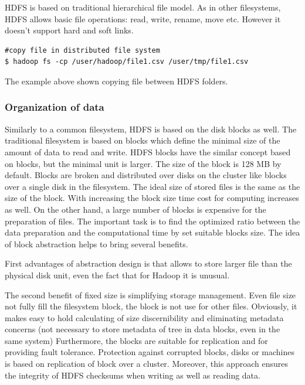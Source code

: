 \documentclass[a4paper,12pt,oneside]{report}
\begin{document}
	HDFS is based on traditional hierarchical file model. As in other filesystems,
	HDFS allows basic file operations: 
	read, write, rename, move etc. However it doesn’t support hard and soft links. 
	
	\begin{footnotesize}
		\begin{lstlisting}[style=mybash]
#copy file in distributed file system
$ hadoop fs -cp /user/hadoop/file1.csv /user/tmp/file1.csv 
		\end{lstlisting}
	\end{footnotesize} 
	The example above shown copying file between HDFS folders. 
	
	
	\subsubsection{Organization of data}
	Similarly to  a common filesystem, HDFS is based on the disk blocks as well. The
	traditional
	filesystem is based on blocks which define the minimal size of the amount of
	data to read and write.
	HDFS blocks have the similar concept based on blocks, but the minimal unit is
	larger. The size of the block is 128 MB by default. Blocks are broken and
	distributed
	over disks on the cluster like blocks over a single disk in the filesystem. The
	ideal 
	size of stored files is the same as the size of the block. With increasing the
	block 
	size time cost for computing increases as well. On the other hand, a large
	number
	of blocks is expensive for the preparation of files. The important task is to
	find the optimized 
	ratio between the data preparation and the computational time by set suitable
	blocks size.
	The idea of block abstraction helps to bring several benefits.
	
	First advantages of
	abstraction design is that allows to store larger file than the physical disk
	unit, 
	even the fact that for Hadoop it is unusual.
	
	The second benefit of fixed size is simplifying storage management. Even file
	size not fully fill the filesystem block, the block is not use for other files. 
	Obviously, it makes easy 
	to hold calculating of size discernibility and eliminating metadata concerns
	(not necessary 
	to store metadata of tree in data blocks, even in the same system)
	Furthermore, the blocks are suitable for replication and for providing fault
	tolerance. Protection
	against corrupted blocks, disks or machines is based on replication of block
	over a cluster. 
	Moreover, this approach ensures the integrity of HDFS checksums when writing as
	well as reading data.
	
\end{document}
